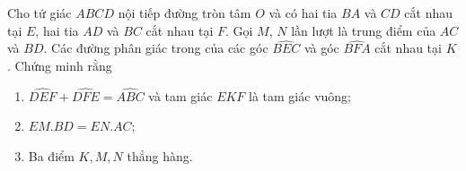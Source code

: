 \begin{ex}%
    Cho tứ giác $ABCD$ nội tiếp đường tròn tâm $O$ và có hai tia $BA$ và $CD$ cắt nhau tại $E$, hai tia $AD$ và $BC$ cắt nhau tại $F$. Gọi $M$, $N$ lần lượt là trung điểm của $AC$ và $BD$. Các đường phân giác trong của các góc $\widehat{BEC}$ và góc $\widehat{BFA}$ cắt nhau tại $K$. Chứng minh rằng
    \begin{enumerate}
        \item $\widehat{DEF}+\widehat{DFE}=\widehat{ABC}$ và tam giác $EKF$ là tam giác vuông;
        \item $EM.BD=EN.AC$;
        \item Ba điểm $K, M, N$ thẳng hàng.
    \end{enumerate}
\loigiai
    {
    \begin{center}
\end{center}}
\end{ex}
